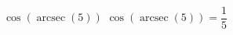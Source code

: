  {$\cos\left(\operatorname{arcsec}\left( 5 \right)\right)$}
{ $\cos\left(\operatorname{arcsec}\left( 5 \right)\right) = \dfrac{1}{5}$ }
